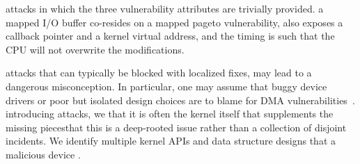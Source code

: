 \DIFdelbegin {}\DIFdelend \DIFaddbegin {}\DIFaddend \simple{} attacks  \DIFdelbegin {}\DIFdelend in which the three vulnerability attributes are trivially provided. \DIFdelbegin {}\DIFdelend \DIFaddbegin {}\DIFaddend a mapped I/O buffer co-resides on a mapped page\DIFdelbegin {}\DIFdelend \DIFaddbegin {}\DIFaddend to \subpage{} vulnerability, \DIFaddbegin {}\DIFaddend also exposes a callback pointer and a kernel virtual address, and the timing is such that the CPU will not overwrite the modifications.

\DIFdelbegin {}\DIFdelend \DIFaddbegin {}\DIFaddend \simple{} attacks \DIFdelbegin \DIFdel{, }\DIFdelend that can typically be blocked with localized fixes, may lead to a dangerous misconception. In particular, one may assume that buggy device drivers or poor but isolated design choices are to blame for DMA vulnerabilities~\cite{malka2015efficient,malka2015riommu}.
\DIFdelbegin {}\DIFdelend \DIFaddbegin {}\DIFaddend introducing \compound attacks, we \DIFdelbegin {}\DIFdelend \DIFaddbegin {}\DIFaddend that it is often the kernel itself that supplements the missing pieces\DIFdelbegin {}\DIFdelend \DIFaddbegin {}\DIFaddend that this is a deep-rooted issue rather than a collection of disjoint incidents.
We identify multiple kernel APIs and data structure designs that \DIFdelbegin {}\DIFdelend \DIFaddbegin {}\DIFaddend a malicious device \DIFaddbegin {}\DIFaddend .



